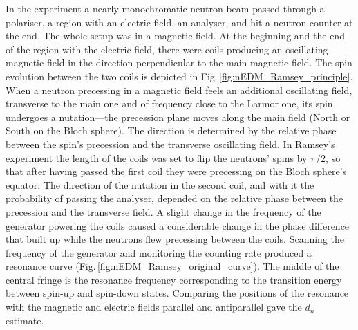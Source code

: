 In the experiment a nearly monochromatic neutron beam passed through a polariser, a region with an electric field, an analyser, and hit a neutron counter at the end. The whole setup was in a magnetic field. At the beginning and the end of the region with the electric field, there were coils producing an oscillating magnetic field in the direction perpendicular to the main magnetic field. The spin evolution between the two coils is depicted in Fig.\,\ref{fig:nEDM_Ramsey_principle}. When a neutron precessing in a magnetic field feels an additional oscillating field, transverse to the main one and of frequency close to the Larmor one, its spin undergoes a nutation---the precession plane moves along the main field (North or South on the Bloch sphere). The direction is determined by the relative phase between the spin's precession and the transverse oscillating field. In Ramsey's experiment the length of the coils was set to flip the neutrons' spins by $\pi/2$, so that after having passed the first coil they were precessing on the Bloch sphere's equator. The direction of the nutation in the second coil, and with it the probability of passing the analyser, depended on the relative phase between the precession and the transverse field. A slight change in the frequency of the generator powering the coils caused a considerable change in the phase difference that built up while the neutrons flew precessing between the coils. Scanning the frequency of the generator and monitoring the counting rate produced a resonance curve (Fig.\,\ref{fig:nEDM_Ramsey_original_curve}). The middle of the central fringe is the resonance frequency corresponding to the transition energy between spin-up and spin-down states.
Comparing the positions of the resonance with the magnetic and electric fields parallel and antiparallel gave the $d_n$ estimate.

